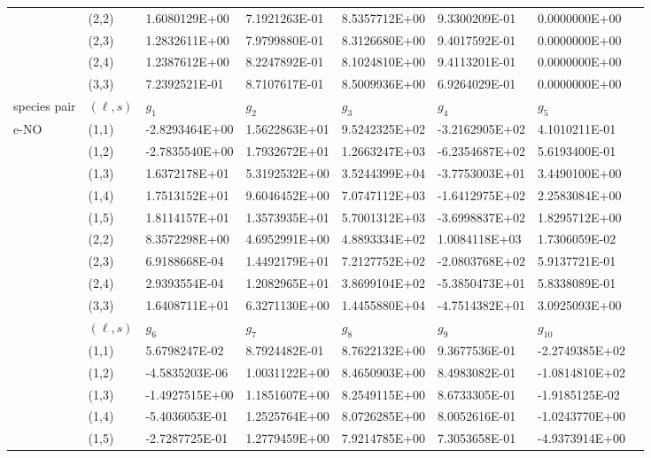 \documentclass{warpdoc}
\begin{document}
\begin{table*}[h]
\begin{center}
\begin{threeparttable}
\begin{tabular*}{\textwidth}{@{\extracolsep{\fill}}llllllll}
&	(2,2)	&	1.6080129E+00	&	7.1921263E-01	&	8.5357712E+00	&	9.3300209E-01	&	0.0000000E+00	\\
&	(2,3)	&	1.2832611E+00	&	7.9799880E-01	&	8.3126680E+00	&	9.4017592E-01	&	0.0000000E+00	\\
&	(2,4)	&	1.2387612E+00	&	8.2247892E-01	&	8.1024810E+00	&	9.4113201E-01	&	0.0000000E+00	\\
&	(3,3)	&	7.2392521E-01	&	8.7107617E-01	&	8.5009936E+00	&	6.9264029E-01	&	0.0000000E+00	\\
      \midrule
species pair & $(\ell,s)$ & $g_1$ & $g_2$ & $g_3$ & $g_4$ & $g_5$ \\
\midrule
\multirow{19}{*}{e-NO} &	(1,1)	&	-2.8293464E+00	&	1.5622863E+01	&	9.5242325E+02	&	-3.2162905E+02	&	4.1010211E-01	\\
&	(1,2)	&	-2.7835540E+00	&	1.7932672E+01	&	1.2663247E+03	&	-6.2354687E+02	&	5.6193400E-01	\\
&	(1,3)	&	1.6372178E+01	&	5.3192532E+00	&	3.5244399E+04	&	-3.7753003E+01	&	3.4490100E+00	\\
&	(1,4)	&	1.7513152E+01	&	9.6046452E+00	&	7.0747112E+03	&	-1.6412975E+02	&	2.2583084E+00	\\
&	(1,5)	&	1.8114157E+01	&	1.3573935E+01	&	5.7001312E+03	&	-3.6998837E+02	&	1.8295712E+00	\\
&	(2,2)	&	8.3572298E+00	&	4.6952991E+00	&	4.8893334E+02	&	1.0084118E+03	&	1.7306059E-02	\\
&	(2,3)	&	6.9188668E-04	&	1.4492179E+01	&	7.2127752E+02	&	-2.0803768E+02	&	5.9137721E-01	\\
&	(2,4)	&	2.9393554E-04	&	1.2082965E+01	&	3.8699104E+02	&	-5.3850473E+01	&	5.8338089E-01	\\
&	(3,3)	&	1.6408711E+01	&	6.3271130E+00	&	1.4455880E+04	&	-4.7514382E+01	&	3.0925093E+00	\\
\cmidrule(lr{1em}){2-7}
 & $(\ell,s)$ & $g_6$ & $g_7$ & $g_8$ & $g_9$ & $g_{10}$ \\
\cmidrule(lr{1em}){2-7}
&	(1,1)	&	5.6798247E-02	&	8.7924482E-01	&	8.7622132E+00	&	9.3677536E-01	&	-2.2749385E+02	\\
&	(1,2)	&	-4.5835203E-06	&	1.0031122E+00	&	8.4650903E+00	&	8.4983082E-01	&	-1.0814810E+02	\\
&	(1,3)	&	-1.4927515E+00	&	1.1851607E+00	&	8.2549115E+00	&	8.6733305E-01	&	-1.9185125E-02	\\
&	(1,4)	&	-5.4036053E-01	&	1.2525764E+00	&	8.0726285E+00	&	8.0052616E-01	&	-1.0243770E+00	\\
&	(1,5)	&	-2.7287725E-01	&	1.2779459E+00	&	7.9214785E+00	&	7.3053658E-01	&	-4.9373914E+00	\\

\end{tabular*}
\end{threeparttable}
\end{center}
\end{table*}
\end{document}
